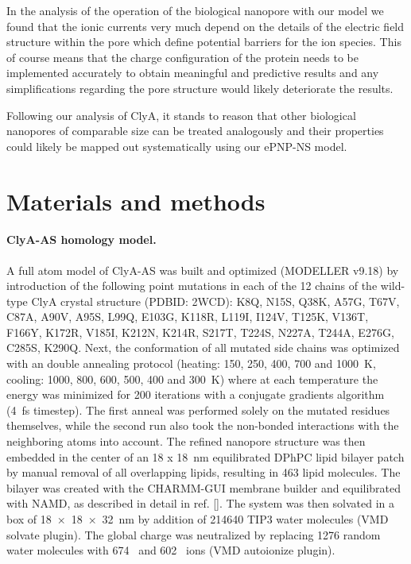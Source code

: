 \documentclass[journal=ancac3,manuscript=article,etalmode=truncate,maxauthors=0,layout=twocolumn]{achemso}
\begin{document}
In the analysis of the operation of the biological nanopore with our model we found that the ionic currents
very much depend on the details of the electric field structure within the pore which define potential
barriers for the ion species. This of course means that the charge configuration of the protein needs to be
implemented accurately to obtain meaningful and predictive results and any simplifications regarding the pore
structure would likely deteriorate the results.

Following our analysis of ClyA, it stands to reason that other biological nanopores of comparable size can be
treated analogously and their properties could likely be mapped out systematically using our ePNP-NS model.


\section{Materials and methods}\label{sec:methods}

\paragraph{ClyA-AS homology model.} A full atom model of ClyA-AS\cite{Soskine-2013} was built and optimized
(MODELLER v9.18\cite{Sali-1993}) by introduction of the following point mutations in each of the 12 chains of
the wild-type ClyA crystal structure (PDBID: 2WCD\cite{Mueller-2009}): K8Q, N15S, Q38K, A57G, T67V, C87A,
A90V, A95S, L99Q, E103G, K118R, L119I, I124V, T125K, V136T, F166Y, K172R, V185I, K212N, K214R, S217T, T224S,
N227A, T244A, E276G, C285S, K290Q. Next, the conformation of all mutated side chains was optimized with an
double annealing protocol (heating: 150, 250, 400, 700 and \SI{1000}{\kelvin}, cooling: 1000, 800, 600, 500,
400 and \SI{300}{\kelvin}) where at each temperature the energy was minimized for 200 iterations with a
conjugate gradients algorithm (\SI{4}{\fs} timestep).\cite{Shanno-1980} The first anneal was performed solely
on the mutated residues themselves, while the second run also took the non-bonded interactions with the
neighboring atoms into account. The refined nanopore structure was then embedded in the center of an \SI{18 x
18}{\nm} equilibrated DPhPC lipid bilayer patch by manual removal of all overlapping lipids, resulting in 463
lipid molecules. The bilayer was created with the CHARMM-GUI\cite{Jo-2008} membrane builder\cite{Lee-2016} and
equilibrated with NAMD\cite{Phillips-2005}, as described in detail in ref. []. The system was
then solvated in a box of \SI{18 x 18 x 32}{\nm} by addition of 214640 TIP3 water molecules (VMD solvate
plugin). The global charge was neutralized by replacing 1276 random water molecules with 674 \Na\ and 602 \Cl\
ions (VMD autoionize plugin).\cite{Humphrey-1996}
\end{document}

